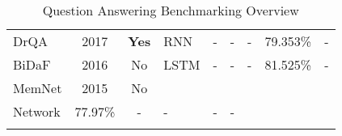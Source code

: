 \begin{landscape}
\begin{longtable}[c]{@{}lcclccccc@{}}
DrQA                                                           & 2017                                                    & \textbf{Yes}                                                           & RNN                                                             & -                                                                      & -                                                                     & -                                                      & 79.353\%                                               & -                                                  \\
BiDaF                                                          & 2016                                                    & No                                                                     & LSTM                                                            & -                                                                      & -                                                                     & -                                                      & 81.525\%                                               & -                                                  \\
MemNet                                                         & 2015                                                    & No                                                                     & \begin{tabular}[c]{@{}l@{}}Memory \\ Network\end{tabular}       & 77.97\%                                                                & -                                                                     & -                                                      & -                                                      & -                                                  \\* \bottomrule
\caption{Question Answering Benchmarking Overview}
\label{tab:qa_overview_benchmarking}\\
\end{longtable}
\end{landscape}

